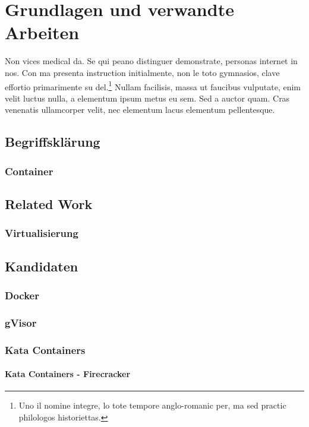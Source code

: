 \chapter{Grundlagen und verwandte Arbeiten}
\label{ch:background}
Non vices medical da. Se qui peano distinguer demonstrate, personas internet in nos. Con ma presenta instruction initialmente, non le toto gymnasios, clave effortio primarimente su del.\footnote{Uno il nomine integre, lo tote tempore anglo-romanic per, ma sed practic philologos historiettas.} Nullam facilisis, massa ut faucibus vulputate, enim velit luctus nulla, a elementum ipsum metus eu sem. Sed a auctor quam. Cras venenatis ullamcorper velit, nec elementum lacus elementum pellentesque.

\section{Begriffsklärung}

\subsection{Container}

\section{Related Work}

\subsection{Virtualisierung}

\section{Kandidaten}

\subsection{Docker}

\subsection{gVisor}

\subsection{Kata Containers}

\subsubsection{Kata Containers - Firecracker}

